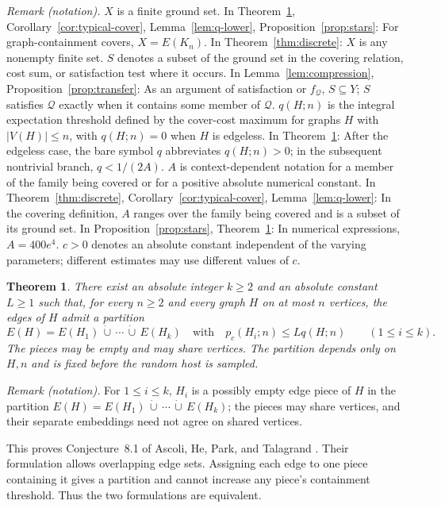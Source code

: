 \documentclass[11pt]{article}
\newtheorem{theorem}{Theorem}[section]
\theoremstyle{remark}
\numberwithin{equation}{section}
\newcommand{\calQ}{\mathcal Q}
\begin{document}
\noindent\textit{Remark (notation).} $X$ is a finite ground set. In Theorem~\ref{thm:main}, Corollary~\ref{cor:typical-cover}, Lemma~\ref{lem:q-lower}, Proposition~\ref{prop:stars}: For graph-containment covers, $X=E(K_n)$. In Theorem~\ref{thm:discrete}: $X$ is any nonempty finite set. $S$ denotes a subset of the ground set in the covering relation, cost sum, or satisfaction test where it occurs. In Lemma~\ref{lem:compression}, Proposition~\ref{prop:transfer}: As an argument of satisfaction or $f_{\calQ}$, $S\subseteq Y$; $S$ satisfies $\calQ$ exactly when it contains some member of $\calQ$. $q(H;n)$ is the integral expectation threshold defined by the cover-cost maximum for graphs $H$ with $|V(H)|\leq n$, with $q(H;n)=0$ when $H$ is edgeless. In Theorem~\ref{thm:main}: After the edgeless case, the bare symbol $q$ abbreviates $q(H;n)>0$; in the subsequent nontrivial branch, $q<1/(2A)$. $A$ is context-dependent notation for a member of the family being covered or for a positive absolute numerical constant. In Theorem~\ref{thm:discrete}, Corollary~\ref{cor:typical-cover}, Lemma~\ref{lem:q-lower}: In the covering definition, $A$ ranges over the family being covered and is a subset of its ground set. In Proposition~\ref{prop:stars}, Theorem~\ref{thm:main}: In numerical expressions, $A=400e^4$. $c>0$ denotes an absolute constant independent of the varying parameters; different estimates may use different values of $c$.


\begin{theorem}\label{thm:main}
There exist an absolute integer $k\geq2$ and an absolute constant
$L\geq1$ such that, for every $n\geq2$ and every graph $H$ on
at most $n$ vertices, the edges of $H$ admit a partition
\[
 E(H)=E(H_1)\,\dot\cup\,\cdots\,\dot\cup\,E(H_k)
 \quad\text{with}\quad
 p_c(H_i;n)\leq Lq(H;n)\qquad(1\leq i\leq k).
\]
The pieces may be empty and may share vertices. The partition
depends only on $H,n$ and is fixed before the random host is sampled.
\end{theorem}

\noindent\textit{Remark (notation).} For $1\leq i\leq k$, $H_i$ is a possibly empty edge piece of $H$ in the partition $E(H)=E(H_1)\,\dot\cup\,\cdots\,\dot\cup\,E(H_k)$; the pieces may share vertices, and their separate embeddings need not agree on shared vertices.


This proves Conjecture~8.1 of Ascoli, He, Park, and Talagrand
\cite{AHPT26}. Their formulation allows overlapping edge sets.
Assigning each edge to one piece containing it gives a partition
and cannot increase any piece's containment threshold. Thus the
two formulations are equivalent.
\end{document}
